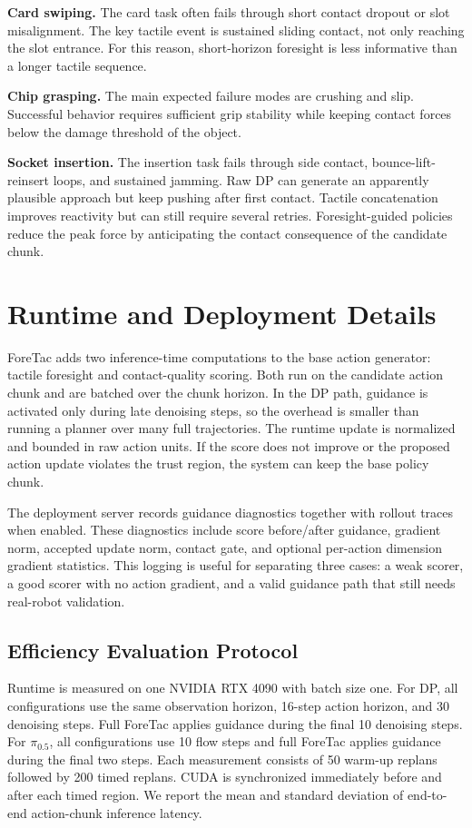 \documentclass[10pt,letterpaper]{article}
\newcommand{\method}{ForeTac}
\begin{document}
\textbf{Card swiping.} The card task often fails through short contact dropout
or slot misalignment. The key tactile event is sustained sliding contact, not
only reaching the slot entrance. For this reason, short-horizon foresight is
less informative than a longer tactile sequence.

\textbf{Chip grasping.} The main expected failure modes are crushing and slip.
Successful behavior requires sufficient grip stability while keeping contact
forces below the damage threshold of the object.

\textbf{Socket insertion.} The insertion task fails through side contact,
bounce-lift-reinsert loops, and sustained jamming. Raw DP can generate an
apparently plausible approach but keep pushing after first contact. Tactile
concatenation improves reactivity but can still require several retries.
Foresight-guided policies reduce the peak force by anticipating the contact
consequence of the candidate chunk.

\section{Runtime and Deployment Details}
\label{sec:runtime}

\method{} adds two inference-time computations to the base action generator:
tactile foresight and contact-quality scoring. Both run on the candidate action
chunk and are batched over the chunk horizon. In the DP path, guidance is
activated only during late denoising steps, so the overhead is smaller than
running a planner over many full trajectories. The runtime update is normalized
and bounded in raw action units. If the score does not improve or the proposed
action update violates the trust region, the system can keep the base policy
chunk.

The deployment server records guidance diagnostics together with rollout
traces when enabled. These diagnostics include score before/after guidance,
gradient norm, accepted update norm, contact gate, and optional per-action
dimension gradient statistics. This logging is useful for separating three
cases: a weak scorer, a good scorer with no action gradient, and a valid
guidance path that still needs real-robot validation.

\subsection{Efficiency Evaluation Protocol}

Runtime is measured on one NVIDIA RTX 4090 with batch size one. For DP, all
configurations use the same observation horizon, 16-step action horizon, and 30
denoising steps. Full ForeTac applies guidance during the final 10 denoising
steps. For $\pi_{0.5}$, all configurations use 10 flow steps and full ForeTac
applies guidance during the final two steps. Each measurement consists of 50
warm-up replans followed by 200 timed replans. CUDA is synchronized immediately
before and after each timed region. We report the mean and standard deviation
of end-to-end action-chunk inference latency.
\end{document}

